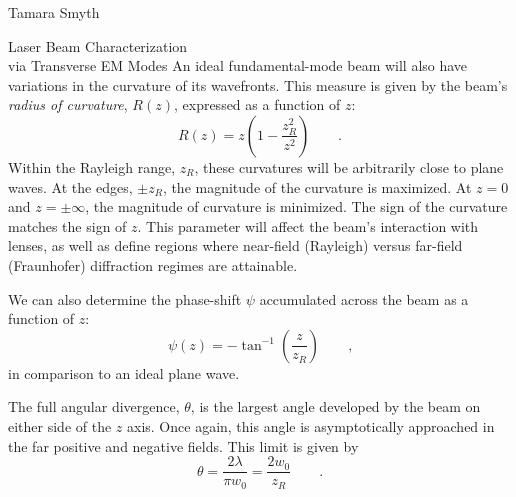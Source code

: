 \documentclass[a4paper,10pt]{report}
\numberwithin{equation}{section}
\begin{document}
\begin{chapter}{Tamara Smyth}
\begin{section}{Laser Beam Characterization\\ via Transverse EM Modes}
An ideal fundamental-mode beam will also have variations in the curvature of its wavefronts. This measure is given by the beam's \emph{radius of curvature}, $R(z)$, expressed as a function of $z$:\cite[p.~12]{Marshall2004}
\begin{equation}\label{rz}
 R(z) = z \left(1 - \frac{z_R^2}{z^2} \right) \qquad \text{.}
\end{equation}
Within the Rayleigh range, $z_R$, these curvatures will be arbitrarily close to plane waves. At the edges, $\pm z_R$, the magnitude of the curvature is maximized. At $z=0$ and $z=\pm \infty$, the magnitude of curvature is minimized. The sign of the curvature matches the sign of $z$. This parameter will affect the beam's interaction with lenses, as well as define regions where near-field (Rayleigh) versus far-field (Fraunhofer) diffraction regimes are attainable. 

We can also determine the phase-shift $\psi$ accumulated across the beam as a function of $z$:\cite[p.~12]{Marshall2004}
\begin{equation}\label{psiz}
 \psi(z) = -\tan^{-1}\left(\frac{z}{z_R}\right) \qquad \text{,}
\end{equation}
in comparison to an ideal plane wave. 

The full angular divergence, $\theta$, is the largest angle developed by the beam on either side of the $z$ axis. Once again, this angle is asymptotically approached in the far positive and negative fields. This limit is given by \cite[p.~12]{Marshall2004}
\begin{equation}\label{fadiv}
 \theta = \frac{2\lambda}{\pi w_0} = \frac{2w_0}{z_R} \qquad \text{.}
\end{equation}


\end{section}
\end{chapter}
\end{document}
